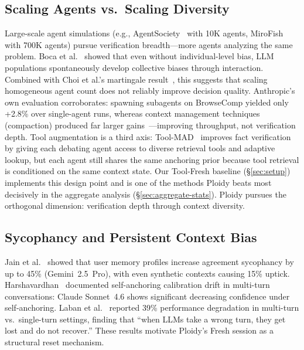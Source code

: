 \documentclass[11pt]{article}
\begin{document}
\subsection{Scaling Agents vs.\ Scaling Diversity}
\label{sec:scaling}

Large-scale agent simulations (e.g., AgentSociety~\citep{pang2025agentsociety} with 10K agents, MiroFish with 700K agents) pursue verification breadth---more agents analyzing the same problem. Boca et al.~\citep{boca2025emergent} showed that even without individual-level bias, LLM populations spontaneously develop collective biases through interaction. Combined with Choi et al.'s martingale result~\citep{choi2025debate}, this suggests that scaling homogeneous agent count does not reliably improve decision quality. Anthropic's own evaluation corroborates: spawning subagents on BrowseComp yielded only +2.8\% over single-agent runs, whereas context management techniques (compaction) produced far larger gains~\citep{anthropic2026harnessing}---improving throughput, not verification depth. Tool augmentation is a third axis: Tool-MAD~\citep{jeong2026toolmad} improves fact verification by giving each debating agent access to diverse retrieval tools and adaptive lookup, but each agent still shares the same anchoring prior because tool retrieval is conditioned on the same context state. Our Tool-Fresh baseline (\S\ref{sec:setup}) implements this design point and is one of the methods Ploidy beats most decisively in the aggregate analysis (\S\ref{sec:aggregate-stats}). Ploidy pursues the orthogonal dimension: verification depth through context diversity.

\subsection{Sycophancy and Persistent Context Bias}
\label{sec:sycophancy}

Jain et al.~\citep{jain2025sycophancy} showed that user memory profiles increase agreement sycophancy by up to 45\% (Gemini~2.5~Pro), with even synthetic contexts causing 15\% uptick. Harshavardhan~\citep{harshavardhan2026sacd} documented self-anchoring calibration drift in multi-turn conversations: Claude Sonnet~4.6 shows significant decreasing confidence under self-anchoring. Laban et al.~\citep{laban2025lost} reported 39\% performance degradation in multi-turn vs.\ single-turn settings, finding that ``when LLMs take a wrong turn, they get lost and do not recover.'' These results motivate Ploidy's Fresh session as a structural reset mechanism.
\end{document}
